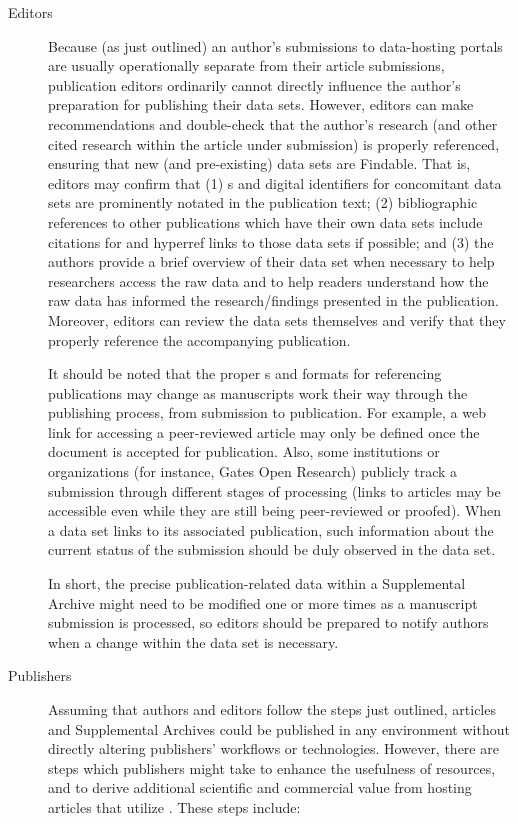 \documentclass[11pt,letterpaper]{article}
\newcommand{\ATexttclr}[1]{\textcolor{tcolor}{\textbf{#1}}}
\newcommand{\URL}{\resizebox{!}{7pt}{\AcronymText{URL}}}
\newcommand{\textscc}[1]{{\color{orr!35!black}{{%
						\fontfamily{Cabin-TLF}\fontseries{b}\selectfont{\textsc{\scriptsize{#1}}}}}}}
\newcommand{\AcronymText}[1]{{\textscc{#1}}}
\newcommand{\SDRF}{\resizebox{!}{8pt}{\ATexttclr{S}}\resizebox{!}{8pt}{\ATexttclr{DR%
\hspace{1pt}{\raisebox{-1pt}{\fontfamily{qhv}\fontseries{b}\selectfont{}\Large{F}}%
}}}}
\begin{document}
{{\begin{description}
\item[Editors]  Because (as just outlined) an author's submissions 
to data-hosting portals are usually operationally separate 
from their article submissions, publication 
editors ordinarily cannot directly influence the author's 
preparation for publishing their data sets.  However, 
editors can make recommendations and double-check that 
the author's research (and other cited research  
within the article under submission) is properly referenced, ensuring 
that new (and pre-existing) data sets are 
Findable.  That is, editors may confirm that (1) \URL{}s 
and digital identifiers for concomitant data sets are prominently 
notated in the publication text; (2) bibliographic 
references to other publications which have their own 
data sets include citations for and hyperref links to 
those data sets if possible; and (3) the authors provide 
a brief overview of their data set when necessary 
to help researchers access the raw data and to help 
readers understand how the raw data has informed the 
research/findings presented in the publication.  
Moreover, editors can review the data sets themselves 
and verify that they 
properly reference the accompanying publication. 

It should be noted that the proper \URL{}s and formats 
for referencing publications may change as manuscripts 
work their way through the publishing process, from 
submission to publication.  
For example, a web link for accessing a peer-reviewed 
article may only be defined once the document is 
accepted for publication.  Also, some institutions 
or organizations  
(for instance, Gates Open Research) 
publicly track a submission through different stages 
of processing (links to articles may be accessible  
even while they are still being peer-reviewed or proofed).  
When a data set links to its associated 
publication, such information about the current 
status of the submission should be duly observed in the 
data set.

In short, the precise publication-related data within a 
Supplemental Archive might need to be modified one 
or more times as a manuscript submission is processed, 
so editors should be prepared to notify authors when 
a change within the data set is necessary.

\item[Publishers]  Assuming that authors and 
editors follow the steps just outlined, 
articles and Supplemental Archives could be 
published in any environment without directly altering 
publishers' workflows or technologies.  
However, there are steps which publishers 
might take to enhance the usefulness of \SDRF{} 
resources, and to derive additional scientific 
and commercial value from hosting articles 
that utilize \SDRF{}.  These steps include:


\end{description}}}
\end{document}
